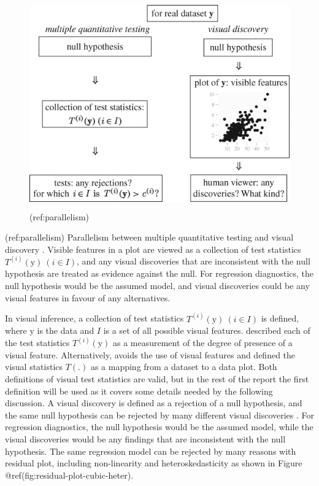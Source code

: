 \documentclass[]{interact}
\theoremstyle{plain}%
\theoremstyle{definition}
\theoremstyle{remark}
\begin{document}
\begin{figure}
\centering
\includegraphics[width=4.6875in,height=3.55208in]{figures/rsta2009012001.jpg}
\caption{(ref:parallelism) \label{fig:parallelism}}
\end{figure}

(ref:parallelism) Parallelism between multiple quantitative testing and
visual discovery \citep{buja_statistical_2009}. Visible features in a
plot are viewed as a collection of test statistics
\(T^{(i)}(\boldsymbol{\mathrm{y}})~(i \in I)\), and any visual
discoveries that are inconsistent with the null hypothesis are treated
as evidence against the null. For regression diagnostics, the null
hypothesis would be the assumed model, and visual discoveries could be
any visual features in favour of any alternatives.

In visual inference, a collection of test statistics
\(T^{(i)}(\boldsymbol{\mathrm{y}})~(i \in I)\) is defined, where
\(\boldsymbol{\mathrm{y}}\) is the data and \(I\) is a set of all
possible visual features. \citet{buja_statistical_2009} described each
of the test statistics \(T^{(i)}(\boldsymbol{\mathrm{y}})\) as a
measurement of the degree of presence of a visual feature.
Alternatively, \citet{majumder_validation_2013} avoids the use of visual
features and defined the visual statistics \(T(.)\) as a mapping from a
dataset to a data plot. Both definitions of visual test statistics are
valid, but in the rest of the report the first definition will be used
as it covers some details needed by the following discussion. A visual
discovery is defined as a rejection of a null hypothesis, and the same
null hypothesis can be rejected by many different visual discoveries
\citep{buja_statistical_2009}. For regression diagnostics, the null
hypothesis would be the assumed model, while the visual discoveries
would be any findings that are inconsistent with the null hypothesis.
The same regression model can be rejected by many reasons with residual
plot, including non-linearity and heteroskedasticity as shown in Figure
@ref(fig:residual-plot-cubic-heter).
\end{document}
